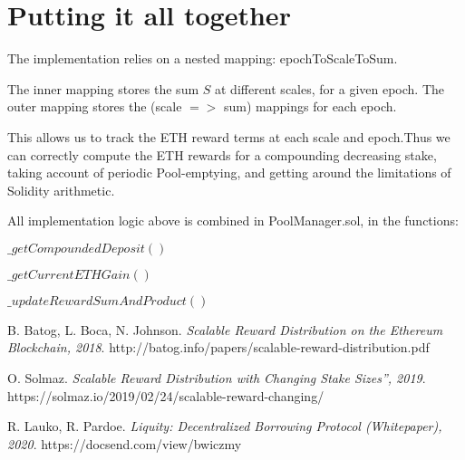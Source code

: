 \documentclass[reqno]{article}
\begin{document}
\bigskip
\section{Putting it all together}

\bigskip
The implementation relies on a nested mapping: epochToScaleToSum. 

\bigskip
The inner mapping stores the sum {$S$} at different scales, for a given epoch. The outer mapping stores the (scale $=>$ sum) mappings for each epoch.

\bigskip
This allows us to track the ETH reward terms at each scale and epoch.Thus we can correctly compute the ETH rewards for a compounding decreasing stake, taking account of periodic Pool-emptying, and getting around the limitations of Solidity arithmetic.

\bigskip
All implementation logic above is combined in PoolManager.sol, in the functions:

\bigskip
$\_getCompoundedDeposit()$

$\_getCurrentETHGain()$

$\_updateRewardSumAndProduct()$


\begin{thebibliography}{9}
B. Batog, L. Boca, N. Johnson.
\textit{Scalable Reward Distribution on the Ethereum Blockchain, 2018}. 
http://batog.info/papers/scalable-reward-distribution.pdf

O. Solmaz. 
\textit{Scalable Reward Distribution with Changing Stake Sizes”, 2019}. 
https://solmaz.io/2019/02/24/scalable-reward-changing/

R. Lauko, R. Pardoe. 
\textit{Liquity: Decentralized Borrowing Protocol (Whitepaper), 2020}. 
https://docsend.com/view/bwiczmy


\end{thebibliography}
\end{document}

